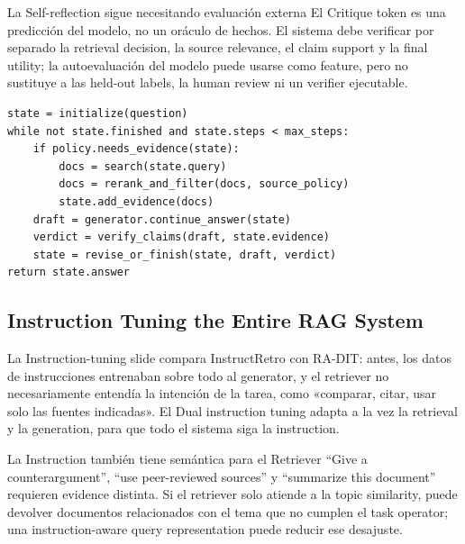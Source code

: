 
\begin{importantbox}{La Self-reflection sigue necesitando evaluación externa}
El Critique token es una predicción del modelo, no un oráculo de hechos. El sistema debe verificar por separado la retrieval decision, la source relevance, el claim support y la final utility; la autoevaluación del modelo puede usarse como feature, pero no sustituye a las held-out labels, la human review ni un verifier ejecutable.
\end{importantbox}

\begin{lstlisting}[caption={Ciclo de active retrieval y evidence verification}]
state = initialize(question)
while not state.finished and state.steps < max_steps:
    if policy.needs_evidence(state):
        docs = search(state.query)
        docs = rerank_and_filter(docs, source_policy)
        state.add_evidence(docs)
    draft = generator.continue_answer(state)
    verdict = verify_claims(draft, state.evidence)
    state = revise_or_finish(state, draft, verdict)
return state.answer
\end{lstlisting}

\subsection{Instruction Tuning the Entire RAG System}

La Instruction-tuning slide compara InstructRetro con RA-DIT: antes, los datos de instrucciones entrenaban sobre todo al generator, y el retriever no necesariamente entendía la intención de la tarea, como «comparar, citar, usar solo las fuentes indicadas». El Dual instruction tuning adapta a la vez la retrieval y la generation, para que todo el sistema siga la instruction.


\begin{knowledgebox}{La Instruction también tiene semántica para el Retriever}
``Give a counterargument'', ``use peer-reviewed sources'' y ``summarize this document'' requieren evidence distinta. Si el retriever solo atiende a la topic similarity, puede devolver documentos relacionados con el tema que no cumplen el task operator; una instruction-aware query representation puede reducir ese desajuste.
\end{knowledgebox}

